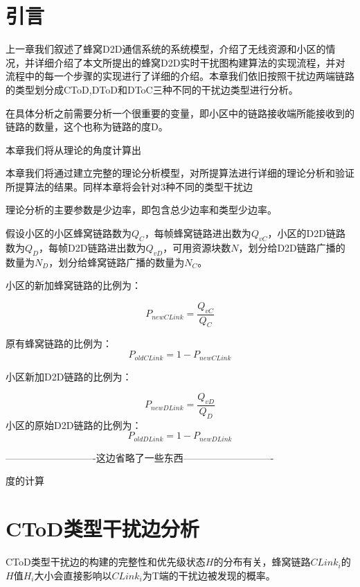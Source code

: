 \documentclass[figurelist,tablelist,algorithmlist,nomlist,masters]{seuthesix}
\begin{document}
	\section{引言}
	上一章我们叙述了蜂窝D2D通信系统的系统模型，介绍了无线资源和小区的情况，并详细介绍了本文所提出的蜂窝D2D实时干扰图构建算法的实现流程，并对流程中的每一个步骤的实现进行了详细的介绍。本章我们依旧按照干扰边两端链路的类型划分成CToD,DToD和DToC三种不同的干扰边类型进行分析。
	
	在具体分析之前需要分析一个很重要的变量，即小区中的链路接收端所能接收到的链路的数量，这个也称为链路的度D。
	
	
	本章我们将从理论的角度计算出
	
	本章我们将通过建立完整的理论分析模型，对所提算法进行详细的理论分析和验证所提算法的结果。同样本章将会针对3种不同的类型干扰边
	
	理论分析的主要参数是少边率，即包含总少边率和类型少边率。
	
	假设小区的小区蜂窝链路数为$Q_C$，每帧蜂窝链路进出数为$Q_{vC}$，小区的D2D链路数为$Q_D$，每帧D2D链路进出数为$Q_{vD}$，可用资源块数$N$，划分给D2D链路广播的数量为$N_D$，划分给蜂窝链路广播的数量为$N_C$。
	
	
	
	小区的新加蜂窝链路的比例为：
	
	\begin{equation}\label{eq3.1}
	{P_{newCLink}} = \frac{{Q_{vC}}}{{Q_C}}
	\end{equation}
	
	原有蜂窝链路的比例为：
	\begin{equation}\label{eq3.2}
	{P_{oldCLink}} = 1 - {P_{newCLink}}
	\end{equation}
	
	小区新加D2D链路的比例为：
	
	\begin{equation}\label{eq3.3}
	{P_{newDLink}} = \frac{{Q_{vD}}}{{Q_D}}
	\end{equation}
	小区的原始D2D链路的比例为：
	\begin{equation}\label{eq3.4}
	{P_{oldDLink}} = 1 - {P_{newDLink}}
	\end{equation}
	
	----------------------------这边省略了一些东西----------------------------
	
	度的计算
	
	\section{CToD类型干扰边分析}
	CToD类型干扰边的构建的完整性和优先级状态${H}$的分布有关，蜂窝链路${CLink_i}$的${H}$值${H_i}$大小会直接影响以${CLink_i}$为T端的干扰边被发现的概率。
	
\end{document}
